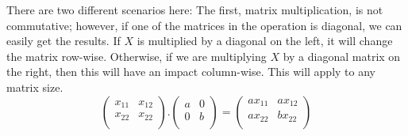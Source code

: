 \documentclass[a4,12pt,twosided,openany]{memoir}
\begin{document}
\par 
\indent
There are two different scenarios here: The first, matrix multiplication, is not commutative; however, if one of the matrices in the operation is diagonal, we can easily get the results. If $X$ is multiplied by a diagonal on the left, it will change the matrix row-wise. Otherwise, if we are multiplying $X$ by a diagonal matrix on the right, then this will have an impact column-wise. This will apply to any matrix size.
\[\begin{pmatrix}
x_{11} & x_{12}  \\
x_{22} & x_{22}  \\
\end{pmatrix}.\begin{pmatrix}
a & 0 \\
0 & b \\
\end{pmatrix} = \begin{pmatrix}
ax_{11} & ax_{12}  \\
ax_{22} & bx_{22}  \\
\end{pmatrix}
\]
\end{document}
